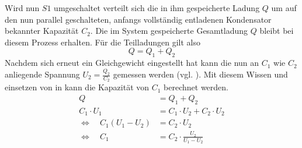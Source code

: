 Wird nun \(S1\) umgeschaltet verteilt sich die in ihm gespeicherte Ladung \(Q\) um auf den nun parallel geschalteten,
anfangs vollständig entladenen Kondensator bekannter Kapazität \(C_2\). Die im System gespeicherte Gesamtladung \(Q\) bleibt
bei diesem Prozess erhalten. Für die Teilladungen gilt also
\begin{equation}
    Q = Q_1 + Q_2
    \label{eq:gesamtladung}
\end{equation}
Nachdem sich erneut ein Gleichgewicht eingestellt hat kann die nun an \(C_1\) wie \(C_2\) anliegende Spannung \(U_2 = \frac{Q_2}{C_2}\) gemessen
werden (vgl. ). Mit diesem Wissen und einsetzen von  in  kann die Kapazität von \(C_1\) berechnet werden.
\begin{align}
    Q               &= Q_1 + Q_2 \nonumber \\
    C_1 \cdot U_1   &= C_1 \cdot U_2 + C_2 \cdot U_2 \nonumber \\
    \Leftrightarrow \quad C_1 (U_1 - U_2)                               &= C_2 \cdot U_2 \nonumber \\
    \Leftrightarrow \quad C_1                                           &= C_2 \cdot \frac{U_2}{U_1 - U_2}
    \label{eq:c1}
\end{align}
%
%
